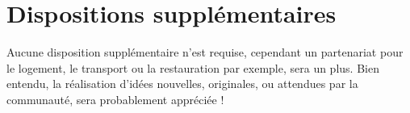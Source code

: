 \documentclass[a4paper,12pt]{scrartcl}
\begin{document}
\section*{Dispositions supplémentaires}


Aucune disposition supplémentaire n’est requise, cependant un partenariat pour le logement, le transport ou la restauration par exemple, sera un plus.
Bien entendu, la réalisation d’idées nouvelles, originales, ou attendues par la communauté, sera probablement appréciée !









\end{document}
